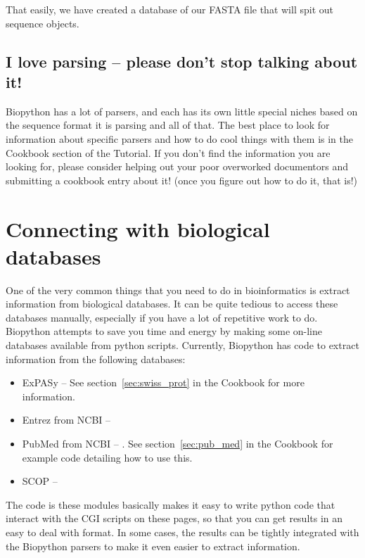 \documentclass{report}
\begin{document}
That easily, we have created a database of our FASTA file that will spit out sequence objects. 


\subsection{I love parsing -- please don't stop talking about it!}

Biopython has a lot of parsers, and each has its own little special niches based on the sequence format it is parsing and all of that. The best place to look for information about specific parsers and how to do cool things with them is in the Cookbook section of the Tutorial. If you don't find the information you are looking for, please consider helping out your poor overworked documentors and submitting a cookbook entry about it! (once you figure out how to do it, that is!)


\section{Connecting with biological databases}

One of the very common things that you need to do in bioinformatics is extract information from biological databases. It can be quite tedious to access these databases manually, especially if you have a lot of repetitive work to do. Biopython attempts to save you time and energy by making some on-line databases available from python scripts. Currently, Biopython has code to extract information from the following databases:

\begin{itemize}
  \item ExPASy --  See section~\ref{sec:swiss_prot} in the Cookbook for more information.
  \item Entrez from NCBI -- 
  \item PubMed from NCBI -- . See section~\ref{sec:pub_med} in the Cookbook for example code detailing how to use this.
  \item SCOP -- 
\end{itemize}

The code is these modules basically makes it easy to write python code that interact with the CGI scripts on these pages, so that you can get results in an easy to deal with format. In some cases, the results can be tightly integrated with the Biopython parsers to make it even easier to extract information.
\end{document}
